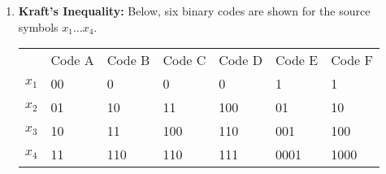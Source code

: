 \documentclass[pdftex,12pt,a4paper]{article}
\begin{document}
\begin{enumerate}
\begin{enumerate}
                \begin{align}
                    I(X;Y) &= H(X) - H(X|Y)\\
                           &= -\sum_{x \in X} {P_X(x) \log P_X(x)}-\sum_{x \in X,y \in Y}P_{XY}(x,y)\log\frac{P_Y(y)}{P_{XY}(x,y)}\\
                           &= - \sum_{x \in X}\sum_{y\in Y} P_X(x) P_{XY}(y|x)\log P_X(x)-\sum_{x \in X}\sum_{y\in Y} P_{XY}(x,y) \log\frac{P_Y(y)}{P_{XY}(x,y)}\\
                           &= -\sum_{x \in X}\sum_{y\in Y} P_{XY}(x,y) \log\frac{P_Y(y)}{P_{XY}(x,y)} - \sum_{x \in X}\sum_{y\in Y} P_{XY}(x,y)\log P_X(x)\\
                           &= \sum_{x \in X}\sum_{y\in Y} P_{XY}(x,y) \left(-\log\frac{P_Y(y)}{P_{XY}(x,y)} - \log P_X(x))\right)\\
                           &= \sum_{x \in X}\sum_{y\in Y} P_{XY}(x,y) (\log P_{XY}(x,y) - (\log P_X(x) + \log P_Y(y)))\\
                           &= \sum_{x \in X}\sum_{y\in Y} P_{XY}(x,y) (\log P_{XY}(x,y) - \log P_X(x)P_Y(y))\\
                           &= \sum_{x \in X}\sum_{y\in Y} P_{XY}(x,y) \log\frac{P_{XY}(x,y)}{P_X(x)P_Y(y)}\\
                           &=D_{\mathrm{KL}}(P_{XY}\|P_{X}P_{Y})
                \end{align}
            \item Use (a) and Class exercise 6 to prove that $H(X|Y) \le H(X)$
                \begin{align}
                    H(X|Y) &\le H(X)\\
                    H(X) - H(X|Y) &\ge 0
                    \intertext{use (a)}
                    D_{\mathrm{KL}}(P_{XY}\|P_{X}P_{Y}) &\ge 0
                    \intertext{use Class exercise 6}
                    P_X = P_{XY}, Q_X = P_{X}P_{Y} 
                \end{align}
        \end{enumerate}
    \item \textbf{Kraft's Inequality:} Below, six binary codes are shown for the source symbols $x_1\dots x_4$.
        \begin{table}[h]
            \centering
            \begin{tabular}{lllllll}
                      & Code A & Code B & Code C & Code D & Code E & Code F \\
                $x_1$ & 00     & 0      & 0      & 0      & 1      & 1      \\
                $x_2$ & 01     & 10     & 11     & 100    & 01     & 10     \\
                $x_3$ & 10     & 11     & 100    & 110    & 001    & 100    \\
                $x_4$ & 11     & 110    & 110    & 111    & 0001   & 1000  
            \end{tabular}
        \end{table}


\end{enumerate}
\end{document}
